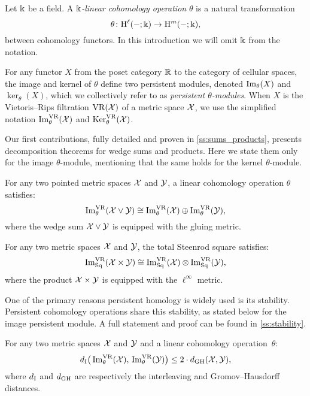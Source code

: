 Let \(\Bbbk\) be a field.
A \textit{\(\Bbbk\)-linear cohomology operation} \(\theta\) is a natural transformation
\[
\theta \colon \mathrm{H}^\ell(-;\Bbbk) \to \mathrm{H}^m(-;\Bbbk),
\]
between cohomology functors.
In this introduction we will omit \(\Bbbk\) from the notation.

For any functor \(X\) from the poset category $\mathbb{R}$ to the category of cellular spaces,
the image and kernel of \(\theta\) define two persistent modules, denoted \(\operatorname{Im}_\theta(X)\) and \(\ker_\theta(X)\), which we collectively refer to as \textit{persistent \(\theta\)-modules}.
When \(X\) is the Vietoris--Rips filtration \(\mathrm{VR}(\mathcal{X})\) of a metric space \(\mathcal{X}\), we use the simplified notation \(\operatorname{Im}_\theta^{\mathrm{VR}}(\mathcal{X})\) and \(\operatorname{Ker}_\theta^{\mathrm{VR}}(\mathcal{X})\).

Our first contributions, fully detailed and proven in \cref{ss:sums_products}, presents decomposition theorems for wedge sums and products.
Here we state them only for the image $\theta$-module, mentioning that the same holds for the kernel $\theta$-module.

\medskip\theorem For any two pointed metric spaces $\mathcal{X}$ and $\mathcal{Y}$, a linear cohomology operation \(\theta\) satisfies:
\[
\operatorname{Im}_\theta^{\mathrm{VR}}(\mathcal{X} \vee \mathcal{Y}) \cong \operatorname{Im}_\theta^{\mathrm{VR}}(\mathcal{X}) \oplus \operatorname{Im}_\theta^{\mathrm{VR}}(\mathcal{Y}),
\]
where the wedge sum \(\mathcal{X} \vee \mathcal{Y}\) is equipped with the gluing metric.

\medskip\theorem
For any two metric spaces $\mathcal{X}$ and $\mathcal{Y}$, the total Steenrod square satisfies:
\[
\operatorname{Im}^{\mathrm{VR}}_{\mathrm{Sq}}(\mathcal{X} \times \mathcal{Y}) \cong \operatorname{Im}^{\mathrm{VR}}_{\mathrm{Sq}}(\mathcal{X}) \otimes \operatorname{Im}^{\mathrm{VR}}_{\mathrm{Sq}}(\mathcal{Y}),
\]
where the product \(\mathcal{X} \times \mathcal{Y}\) is equipped with the \(\ell^\infty\) metric.

\medskip One of the primary reasons persistent homology is widely used is its stability.
Persistent cohomology operations share this stability, as stated below for the image persistent module.
A full statement and proof can be found in \cref{ss:stability}.

\medskip\theorem For any two metric spaces $\mathcal{X}$ and $\mathcal{Y}$ and a linear cohomology operation~$\theta$:
\[
d_{\mathrm{I}}\big(\operatorname{Im}_\theta^{\mathrm{VR}}(\mathcal{X}),\, \operatorname{Im}_\theta^{\mathrm{VR}}(\mathcal{Y})\big) \leq 2 \cdot d_{\mathrm{GH}}(\mathcal{X},\mathcal{Y}),
\]
where \(d_{\mathrm{I}}\) and \(d_{\mathrm{GH}}\) are respectively the interleaving and Gromov--Hausdorff distances.

